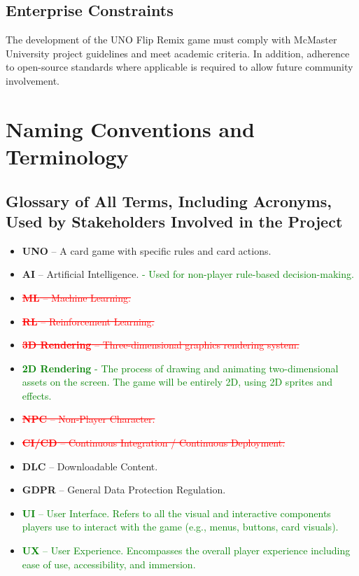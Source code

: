 \documentclass[12pt]{article}
\newcommand{\removed}[1]{\textcolor{red}{\sout{#1}}}
\newcommand{\added}[1]{\textcolor{green}{#1}}
\begin{document}
\subsection{Enterprise Constraints}
The development of the UNO Flip Remix game must comply with McMaster University project guidelines and meet academic criteria. In addition, adherence to open-source standards where applicable is required to allow future community involvement.

\section{Naming Conventions and Terminology}

\subsection{Glossary of All Terms, Including Acronyms, Used by Stakeholders Involved in the Project}

\begin{itemize}
    \item \textbf{UNO} – A card game with specific rules and card actions.
    \item \textbf{AI} – Artificial Intelligence. \added{- Used for non-player rule-based decision-making.}
    \item \removed{ \textbf{ML} – Machine Learning.}
    \item \removed{\textbf{RL} – Reinforcement Learning.}
    \item \removed{\textbf{3D Rendering} – Three-dimensional graphics rendering system.}
    \item \added{\textbf{2D Rendering} - The process of drawing and animating two-dimensional assets on the screen. The game will be entirely 2D, using 2D sprites and effects.}
    \item \removed{ \textbf{NPC} – Non-Player Character. }
    \item \removed{ \textbf{CI/CD} – Continuous Integration / Continuous Deployment. }
    \item \textbf{DLC} – Downloadable Content.
    \item \textbf{GDPR} – General Data 
    Protection Regulation.
    \item \added{\textbf{UI} – User Interface. Refers to all the visual and interactive components players use to interact with the game (e.g., menus, buttons, card visuals).}
    \item \added{\textbf{UX} – User Experience. Encompasses the overall player experience including ease of use, accessibility, and immersion.}
\end{itemize}
\end{document}
